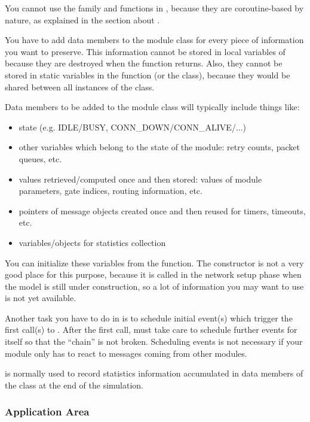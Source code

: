You cannot use the  family and
 functions in , because they are
coroutine-based by nature, as explained in the section about
.

You have to add data members to the module class for every piece
of information you want to preserve. This information cannot
be stored in local variables of  because they
are destroyed when the function returns. Also, they cannot be
stored in static variables in the function (or the class), because
they would be shared between all instances of the class.


Data members to be added to the module class will typically include
things like:

\begin{itemize}
  \item{state (e.g. IDLE/BUSY, CONN\_DOWN/CONN\_ALIVE/...)}
  \item{other variables which belong to the state of the module: retry
    counts, packet queues, etc.}
  \item{values retrieved/computed once and then stored: values of module
    parameters, gate indices, routing information, etc.}
  \item{pointers of message objects created once and then reused for
    timers, timeouts, etc.}
  \item{variables/objects for statistics collection}
\end{itemize}

You can initialize these variables from the 
function.  The constructor is not a very good place
for this purpose, because it is called in the network setup phase when
the model is still under construction, so a lot of information you may
want to use is not yet available.

Another task you have to do in  is to schedule
initial event(s) which trigger the first call(s)
to .  After the first call,
 must take care to schedule further events for
itself so that the ``chain'' is not broken. Scheduling events is not
necessary if your module only has to react to messages coming from
other modules.

 is normally used to record statistics information
accumulated in data members of the class at the end of the simulation.


\subsubsection{Application Area}


